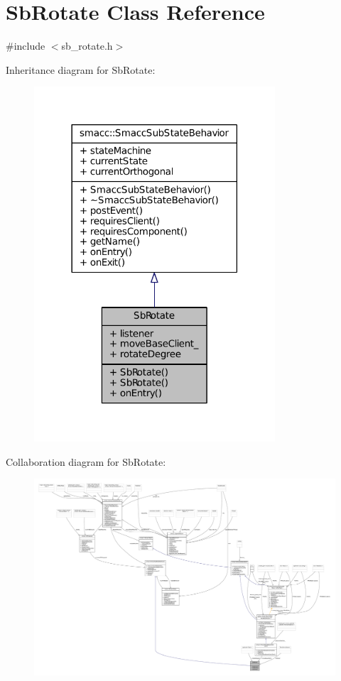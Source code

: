\hypertarget{classSbRotate}{}\section{Sb\+Rotate Class Reference}
\label{classSbRotate}


{\ttfamily \#include $<$sb\+\_\+rotate.\+h$>$}



Inheritance diagram for Sb\+Rotate\+:
\nopagebreak
\begin{figure}[H]
\begin{center}
\leavevmode
\includegraphics[width=254pt]{classSbRotate__inherit__graph}
\end{center}
\end{figure}


Collaboration diagram for Sb\+Rotate\+:
\nopagebreak
\begin{figure}[H]
\begin{center}
\leavevmode
\includegraphics[width=350pt]{classSbRotate__coll__graph}
\end{center}
\end{figure}
